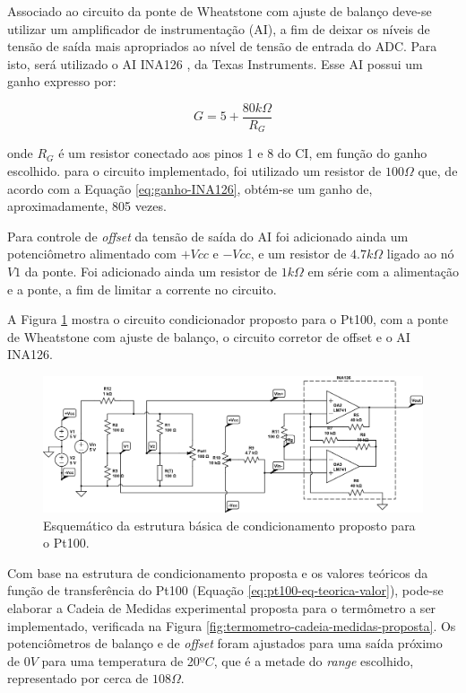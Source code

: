 \documentclass[a4paper]{instrumentacao}
\begin{document}
Associado ao circuito da ponte de Wheatstone com ajuste de balanço deve-se utilizar um amplificador de instrumentação (AI), a fim de deixar os níveis de tensão de saída mais apropriados ao nível de tensão de entrada do ADC. Para isto, será utilizado o AI INA126 \cite{datasheet-INA126}, da Texas Instruments. Esse AI possui um ganho expresso por:

 \begin{equation}
	G=5+\frac{80k\Omega}{R_G}
	\label{eq:ganho-INA126}
\end{equation}

\noindent onde $R_G$ é um resistor conectado aos pinos 1 e 8 do CI, em função do ganho escolhido. para o circuito implementado, foi utilizado um resistor de $100\Omega$ que, de acordo com a Equação \ref{eq:ganho-INA126}, obtém-se um ganho de, aproximadamente, 805 vezes.

Para controle de \textit{offset} da tensão de saída do AI foi adicionado ainda um potenciômetro alimentado com $+Vcc$ e $-Vcc$, e um resistor de $4.7k\Omega$ ligado ao nó $V1$ da ponte. Foi adicionado ainda um resistor de $1k\Omega$ em série com a alimentação e a ponte, a fim de limitar a corrente no circuito.

A Figura \ref{fig:termometro-ckt-condicionador-completo} mostra o circuito condicionador proposto para o Pt100, com a ponte de Wheatstone com ajuste de balanço, o circuito corretor de offset e o AI INA126.

\begin{figure}[H]
	\centering \includegraphics[width=\textwidth]{pt100-condicionamento-completo.png}
	\caption{Esquemático da estrutura básica de condicionamento proposto para o Pt100.}
	\label{fig:termometro-ckt-condicionador-completo}
\end{figure}

Com base na estrutura de condicionamento proposta e os valores teóricos da função de transferência do Pt100 (Equação \ref{eq:pt100-eq-teorica-valor}), pode-se elaborar a Cadeia de Medidas experimental proposta para o termômetro a ser implementado, verificada na Figura \ref{fig:termometro-cadeia-medidas-proposta}. Os potenciômetros de balanço e de \textit{offset} foram ajustados para uma saída próximo de $0V$ para uma temperatura de 20$ºC$, que é a metade do \textit{range} escolhido, representado por cerca de $108\Omega$.
\end{document}
